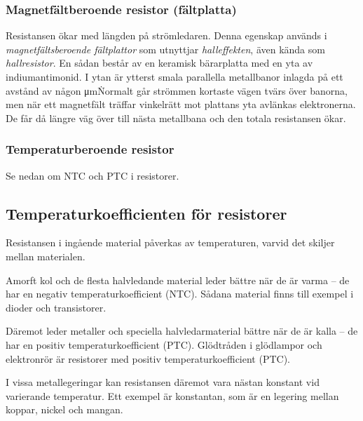 \subsubsection{Magnetfältberoende resistor (fältplatta)}

Resistansen ökar med längden på strömledaren. Denna egenskap används i
\emph{magnetfältsberoende fältplattor} som utnyttjar \emph{halleffekten}, även
kända som \emph{hallresistor}. En sådan består av en keramisk bärarplatta med
en yta av indiumantimonid.
I ytan är ytterst smala parallella metallbanor inlagda på ett avstånd av någon
\si{\micro\metre}\.
Normalt går strömmen kortaste vägen tvärs över banorna, men när ett magnetfält
träffar vinkelrätt mot plattans yta avlänkas elektronerna.
De får då längre väg över till nästa metallbana och den totala resistansen
ökar.

\subsubsection{Temperaturberoende resistor}

Se nedan om NTC och PTC i resistorer.

\subsection{Temperaturkoefficienten för resistorer}
\label{resistor_temperaturkoefficient}

Resistansen i ingående material påverkas av temperaturen, varvid det skiljer
mellan materialen.

Amorft kol och de flesta halvledande material leder bättre när de är varma -- de
har en negativ temperaturkoefficient (NTC). Sådana material finns till exempel i
dioder och transistorer.

Däremot leder metaller och speciella halvledarmaterial bättre när de är kalla
-- de har en positiv temperaturkoefficient (PTC). Glödtråden i glödlampor och
elektronrör är resistorer med positiv temperaturkoefficient (PTC).

I vissa metallegeringar kan resistansen däremot vara nästan konstant vid varierande 
temperatur. Ett exempel är konstantan, som är en legering mellan koppar, nickel 
och mangan.

